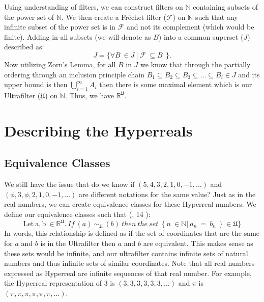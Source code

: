 \documentclass[12pt]{report}
\newcommand{\R}{\mathbb{R}}
\newcommand{\N}{\mathbb{N}}
\newcommand{\U}{\mathfrak{U}}
\begin{document}
Using understanding of filters, we can construct filters on $\N$ containing subsets of the power set of $\N$.
We then create a Fr\'echet filter ($\mathcal{F}$) on $\N$ such that any infinite subset of the power set is in $\mathcal{F}$ and not its complement (which would be finite).
Adding in all subsets (we will denote as $B$) into a common superset ($J$) described as:\[J=\{\forall B\ \in J\ |\ \mathcal{F}\ \subseteq B\ \ \}.\]
Now utilizing Zorn's Lemma, for all $B$ in $J$ we know that through the partially ordering through an inclusion principle chain $B_1\subseteq B_2\subseteq B_3\subseteq\ldots\subseteq B_i\in J $ and its upper bound is then $\bigcup_{i=1}^{\infty}A_i$ then there is some maximal element which is our Ultrafilter ($\U$) on $\N$.
Thus, we have $\R^{\mathfrak{U}} $.


\chapter{ Describing the Hyperreals}
\section*{Equivalence Classes}
We still have the issue that do we know if $(5,4,3,2,1,0,-1,\ldots)$ and $(\phi,3,\phi, 2,1,0,-1,\ldots)$ are different notations for the same value?
Just as in the real numbers, we can create equivalence classes for these Hyperreal numbers.
We define our equivalence classes such that (, 14 ):
\[\mathrm{Let\ a,b\ \in \R^{\U}}.\ If\ (a)\ \sim_{\U}\ (b)\ then\ the\ set\ \ \{\ n\ \in \N|\ a_{n}\ =\ b_{n}\ \ \}\ \in \U \}\]
In words, this relationship is defined as if the set of coordinates that are the same for $a$ and $b$ is in the Ultrafilter then $a$ and $b$ are equivalent.
This makes sense as these sets would be infinite, and our ultrafilter contains infinite sets of natural numbers and thus infinite sets of similar coordinates.
Note that all real numbers expressed as Hyperreal are infinite sequences of that real number.
For example, the Hyperreal representation of 3 is $(3,3,3,3,3, 3, \ldots)$ and $\pi$ is $(\pi, \pi, \pi,\pi, \pi, \pi, \ldots)$.
\end{document}
